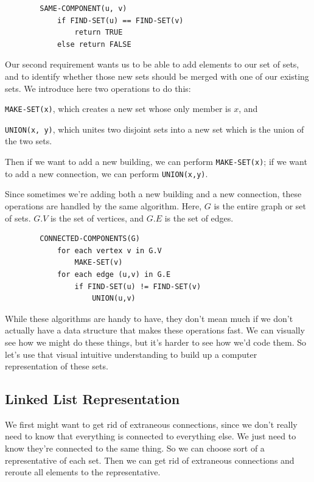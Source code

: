 \documentclass[]{article}
\begin{document}
    \begin{verbatim}
        SAME-COMPONENT(u, v)
            if FIND-SET(u) == FIND-SET(v)
                return TRUE
            else return FALSE
    \end{verbatim}

    Our second requirement wants us to be able to add elements to our set of sets, and to identify whether those new sets should be merged with one of our existing sets. We introduce here two operations to do this:

    \texttt{MAKE-SET(x)}, which creates a new set whose only member is $x$, and
    
    \texttt{UNION(x, y)}, which unites two disjoint sets into a new set which is the union of the two sets. 

    Then if we want to add a new building, we can perform \texttt{MAKE-SET(x)}; if we want to add a new connection, we can perform \texttt{UNION(x,y)}. 

    Since sometimes we're adding both a new building and a new connection, these operations are handled by the same algorithm. Here, $G$ is the entire graph or set of sets. $G.V$ is the set of vertices, and $G.E$ is the set of edges.

    \begin{verbatim}
        CONNECTED-COMPONENTS(G)
            for each vertex v in G.V
                MAKE-SET(v)
            for each edge (u,v) in G.E
                if FIND-SET(u) != FIND-SET(v)
                    UNION(u,v)
    \end{verbatim}

    While these algorithms are handy to have, they don't mean much if we don't actually have a data structure that makes these operations fast. We can visually see how we might do these things, but it's harder to see how we'd code them. So let's use that visual intuitive understanding to build up a computer representation of these sets. 

    \subsection*{Linked List Representation}

    We first might want to get rid of extraneous connections, since we don't really need to know that everything is connected to everything else. We just need to know they're connected to the same thing. So we can choose sort of a representative of each set. Then we can get rid of extraneous connections and reroute all elements to the representative. 
\end{document}
